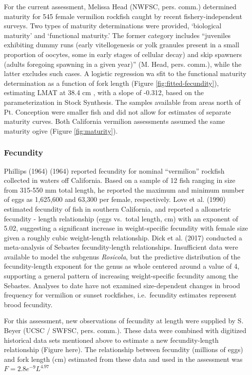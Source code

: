 \documentclass[
  english,
  a4paper,
]{article}
\begin{document}
For the current assessment, Melissa Head (NWFSC, pers. comm.) determined maturity
for 545 female vermilion rockfish caught by recent fishery-independent surveys. Two types
of maturity determinations were provided, `biological maturity' and `functional
maturity.' The former category includes ``juveniles exhibiting dummy runs (early
vitellogenesis or yolk granules present in a small proportion of oocytes, some
in early stages of cellular decay) and skip spawners (adults foregoing spawning
in a given year)'' (M. Head, pers. comm.), while the latter excludes such cases.
A logistic regression wa sfit to the functional maturity determination as a function of fork length (Figure \ref{fig:fitted-fecundity}), estimating LMAT at 38.4 cm , with a slope of -0.312,
based on the parameterization in Stock Synthesis. The samples available from areas north of Pt. Conception were smaller fish and did not allow for estimates of separate
maturity curves. Both California vermilion assessments assumed the same maturity
ogive (Figure \ref{fig:maturity}).

\hypertarget{fecundity}{%
\subsubsection{Fecundity}\label{fecundity}}

Phillips (1964) (1964) reported fecundity for nominal ``vermilion'' rockfish collected in waters off California. Based on a sample of 12 fish ranging in size from 315-550 mm total length, he reported the maximum and minimum number of eggs as 1,625,600 and 63,300 per female, respectively. Love et al. (1990) estimated fecundity of fish in southern California, and reported a allometric fecundity - length relationship (eggs vs.~total length, cm) with an exponent of 5.02, suggesting a significant increase in weight-specific fecundity with female size given a roughly cubic weight-length relationship. Dick et al. (2017) conducted a meta-analysis of Sebastes fecundity-length relationships. Insufficient data were available to model the subgenus \emph{Rosicola}, but the predictive distribution of the fecundity-length exponent for the genus as whole centered around a value of 4, supporting a general pattern of increasing weight-specific fecundity among the Sebastes. Analyses to date have not examined size-dependent changes in brood frequency for vermilion or sunset rockfishes, i.e.~fecundity estimates represent brood fecundity.

For this assessment, new observations of fecundity at length were supplied by S. Beyer (UCSC / SWFSC, pers. comm.). These data were combined with digitized historical data sets mentioned above to estimate a new fecundity-length relationship (Figure here). The relationship between fecundity (millions of eggs) and fork length (cm) estimated from these data and used in the assessment was
\(F = 2.8e^{-9}L^{4.97}\)
\end{document}
